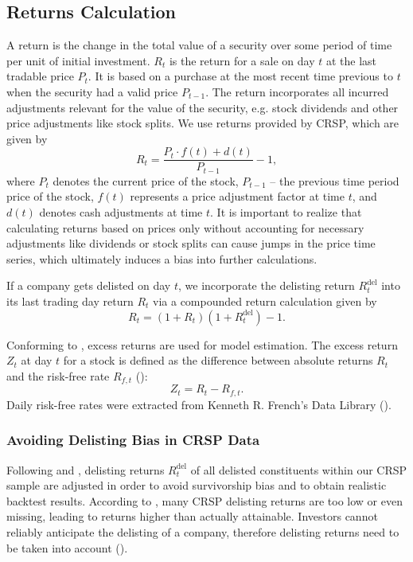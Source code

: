 \documentclass[11pt,a4paper]{article}
\begin{document}
\subsection{Returns Calculation}

A return is the change in the total value of a security over some period of time per unit of initial investment. $R_t$ is the return for a sale on day $t$ at the last tradable price $P_t$. It is based on a purchase at the most recent time previous to $t$ when the security had a valid price $P_{t-1}$. The return incorporates all incurred adjustments relevant for the value of the security, e.g. stock dividends and other price adjustments like stock splits. We use returns provided by CRSP, which are given by
\begin{equation}
    R_t = \dfrac{P_t \cdot f(t) + d(t)}{P_{t-1}} - 1,
\end{equation}
where $P_t$ denotes the current price of the stock, $P_{t-1}$ -- the previous time period price of the stock, $f(t)$ represents a price adjustment factor at time $t$, and $d(t)$ denotes cash adjustments at time $t$. It is important to realize that calculating returns based on prices only without accounting for necessary adjustments like dividends or stock splits can cause jumps in the price time series, which ultimately induces a bias into further calculations.

If a company gets delisted on day $t$, we incorporate the delisting return $R_t^\textrm{del}$ into its last trading day return $R_t$ via a compounded return calculation given by
\begin{equation}
R_t = (1 + R_t)(1 + R_t^\textrm{del}) - 1.
\end{equation}


Conforming to , excess returns are used for model estimation. The excess return $Z_t$ at day $t$ for a stock is defined as the difference between absolute returns $R_t$ and the risk-free rate $R_{f,t}$ ():
\begin{equation}
    Z_t = R_t - R_{f,t}.
\end{equation}
Daily risk-free rates were extracted from Kenneth R. French's Data Library ().



\subsubsection{Avoiding Delisting Bias in CRSP Data}

Following  and , delisting returns $R_t^\textrm{del}$ of all delisted \indexName{} constituents within our CRSP sample are adjusted in order to avoid survivorship bias and to obtain realistic backtest results. According to , many CRSP delisting returns are too low or even missing, leading to returns higher than actually attainable. Investors cannot reliably anticipate the delisting of a company, therefore delisting returns need to be taken into account ().
\end{document}
